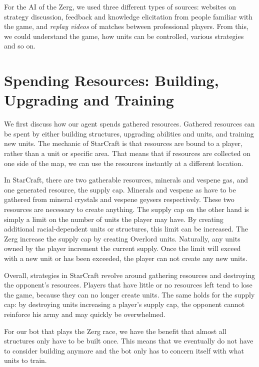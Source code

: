 For the AI of the Zerg, we used three different types of sources: websites on strategy discussion, feedback and knowledge elicitation from people familiar with the game, and \emph{replay videos} of matches between professional players. From this, we could understand the game, how units can be controlled, various strategies and so on.


\section{Spending Resources: Building, Upgrading and Training}
\label{strategy:but}
We first discuss how our agent spends gathered resources. Gathered resources can be spent by either building structures, upgrading abilities and units, and training new units. The mechanic of StarCraft is that resources are bound to a player, rather than a unit or specific area. That means that if resources are collected on one side of the map, we can use the resources instantly at a different location.

In StarCraft, there are two gatherable resources, minerals and vespene gas, and one generated resource, the supply cap. Minerals and vespene as have to be gathered from mineral crystals and vespene geysers respectively. These two resources are necessary to create anything. The supply cap on the other hand is simply a limit on the number of units the player may have. By creating additional racial-dependent units or structures, this limit can be increased. The Zerg increase the supply cap by creating Overlord units. Naturally, any units owned by the player increment the current supply. Once the limit will exceed with a new unit or has been exceeded, the player can not create any new units.

Overall, strategies in StarCraft revolve around gathering resources and destroying the opponent's resources. Players that have little or no resources left tend to lose the game, because they can no longer create units. The same holds for the supply cap: by destroying units increasing a player's supply cap, the opponent cannot reinforce his army and may quickly be overwhelmed.

For our bot that plays the Zerg race, we have the benefit that almost all structures only have to be built once. This means that we eventually do not have to consider building anymore and the bot only has to concern itself with what units to train.

